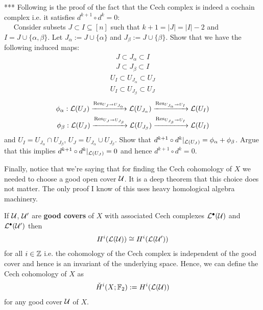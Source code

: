 \begin{ques}***
	Following is the proof of the fact that the Cech complex is indeed a cochain complex i.e. it satisfies $d^{k+1} \circ d^{k} = 0$:\\

  $\quad$ Consider subsets $J \subset I \subseteq [n]$ such that $k+1 = |J| = |I| - 2$ and $I = J \cup \{\alpha, \beta \}$. Let $J_{\alpha} := J \cup \{ \alpha \}$ and $J_{\beta} := J \cup \{ \beta \}$. Show that we have the following induced maps:
		\begin{align*}
	    J \subset J_\alpha \subset I \\
	      J \subset J_\beta \subset I
	  \end{align*}
		\begin{align*}
	    U_{I} \subset U_{J_\alpha} \subset U_{J} \\
	    U_{I} \subset U_{J_\beta} \subset U_{J}
	  \end{align*}
		\begin{align*}
			\phi_\alpha: \mathcal{L}(U_J) \xrightarrow{\operatorname{Res}_{U_J \rightarrow U_{J_\alpha}}} \mathcal{L}(U_{J_\alpha}) \xrightarrow{\operatorname{Res}_{U_{J_\alpha} \rightarrow U_{I}}} \mathcal{L}(U_I) \\
			\phi_\beta: 	\mathcal{L}(U_J) \xrightarrow{\operatorname{Res}_{U_J \rightarrow U_{J_\beta}}} \mathcal{L}(U_{J_\beta}) \xrightarrow{\operatorname{Res}_{U_{J_\beta} \rightarrow U_{I}}} \mathcal{L}(U_I)
		\end{align*}
		and $U_{I} = U_{J_\alpha} \cap U_{J_\beta}$, $U_{J} = U_{J_\alpha} \cup U_{J_\beta}$.
		Show that $d^{k+1} \circ d^{k}|_{\mathcal{L}(U_J)} = \phi_{\alpha} + \phi_{\beta}$. Argue that this implies $d^{k+1} \circ d^{k}|_{\mathcal{L}(U_J)} = 0$ and hence $d^{k+1} \circ d^{k} = 0$.
\end{ques}

Finally, notice that we're saying that for finding the Cech cohomology of $X$ we needed to choose a good open cover $\mathcal{U}$. It is a deep theorem that this choice does not matter. The only proof I know of this uses heavy homological algebra machinery.

\begin{thm}
	\label{thm:good_covers_theorem}
	If $ \mathcal{U}$, $\mathcal{U}'$ are \textbf{good covers} of $ X$ with associated Cech complexes $ \mathcal{L}^\bullet(\mathcal{U})$ and $ \mathcal{L}^\bullet(\mathcal{U}')$ then
	\begin{align}
		H^i(\mathcal{L}(\mathcal{U})) \cong  H^i(\mathcal{L}(\mathcal{U}'))
	\end{align}
	for all $ i \in \mathbb{Z}$ i.e. the cohomology of the Cech complex is independent of the good cover and hence is an invariant of the underlying space. Hence, we can define the Cech cohomology of $ X$ as
	\begin{align}
		\check H^i(X; \mathbb{F}_2) :=  H^i(\mathcal{L}(\mathcal{U}))
	\end{align}
	for any good cover $ \mathcal{U}$ of $ X$.
\end{thm}
